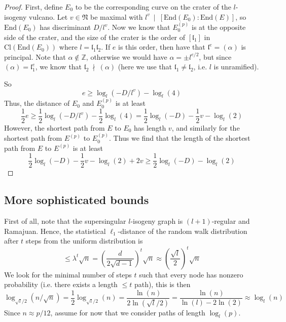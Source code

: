 \documentclass{scrartcl}
\newcommand{\N}{\mathbb{N}}
\newcommand{\Z}{\mathbb{Z}}
\newcommand{\End}{\mathrm{End}}
\newcommand{\divides}{\ \mid \ }
\newcommand{\notdivides}{\ \nmid \ }
\newcommand{\Cl}{\mathrm{Cl}}
\renewcommand{\l}{\mathfrak{l}}
\renewcommand{\N}{\mathfrak{N}}
\theoremstyle{definition}
\begin{document}
\begin{proof}
    First, define $E_0$ to be the corresponding curve on the crater of the $l$-isogeny vulcano.
    Let $v \in \N$ be maximal with $l^v \divides [\End(E_0) : \End(E)]$, so $\End(E_0)$ has discriminant $D/l^v$.
    Now we know that $E_0^{(p)}$ is at the opposite side of the crater, and the size of the crater is the order of $[\l_1]$ in $\Cl(\End(E_0))$ where $l = \l_1\l_2$.
    If $e$ is this order, then have that $\l^e = (\alpha)$ is principal.
    Note that $\alpha \notin \Z$, otherwise we would have $\alpha = \pm l^{e/2}$, but since $(\alpha) = \l_1^e$, we know that $\l_2 \notdivides (\alpha)$ (here we use that $\l_1 \neq \l_2$, i.e. $l$ is unramified).

    So
    \begin{equation*}
        e \geq \log_l(-D/l^v) - \log_l(4)
    \end{equation*}
    Thus, the distance of $E_0$ and $E_0^{(p)}$ is at least
    \begin{equation*}
        \frac 1 2 e \geq \frac 1 2 \log_l(-D/l^v) - \frac 1 2 \log_l(4) = \frac 1 2 \log_l(-D) - \frac 1 2 v - \log_l(2)
    \end{equation*}
    However, the shortest path from $E$ to $E_0$ has length $v$, and similarly for the shortest path from $E^{(p)}$ to $E_0^{(p)}$.
    Thus we find that the length of the shortest path from $E$ to $E^{(p)}$ is at least
    \begin{equation*}
        \frac 1 2 \log_l(-D) - \frac 1 2 v - \log_l(2) + 2v \geq \frac 1 2 \log_l(-D) - \log_l(2)
    \end{equation*}
\end{proof}

\subsection*{More sophisticated bounds}
First of all, note that the supersingular $l$-isogeny graph is $(l + 1)$-regular and Ramajuan.
Hence, the statistical $\ell_1$-distance of the random walk distribution after $t$ steps from the uniform distribution is
\begin{equation*}
    \leq \lambda^t \sqrt{n} = \left( \frac {d} {2\sqrt{d - 1}} \right)^t \sqrt{n} \approx \left( \frac {\sqrt{l}} 2 \right)^t \sqrt{n}
\end{equation*}
We look for the minimal number of steps $t$ such that every node has nonzero probability (i.e. there exists a length $\leq t$ path), this is then
\begin{equation*}
    \log_{\sqrt{l}/2} (n/\sqrt{n}) = \frac 1 2 \log_{\sqrt{l}/2}(n) = \frac {\ln(n)} {2\ln(\sqrt{l}/2)} = \frac {\ln(n)} {\ln(l) - 2\ln(2)} \approx \log_l(n)
\end{equation*}
Since $n \approx p/12$, assume for now that we consider paths of length $\log_l(p)$.
\end{document}
